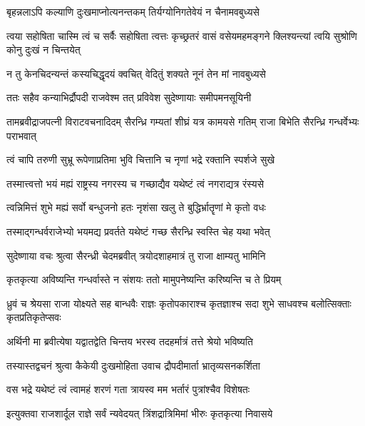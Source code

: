 \twolineshloka
{बृहन्नलाऽपि कल्याणि दुःखमाप्नोत्यनन्तकम्}
{तिर्यग्योनिगतेवेयं न चैनामवबुध्यसे}


\threelineshloka
{त्वया सहोषिता चास्मि त्वं च सर्वैः सहोषिता}
{त्वत्तः कृच्छ्रतरं वासं वसेयमहमङ्गने}
{क्लिश्यन्त्यां त्वयि सुश्रोणि कोनु दुःखं न चिन्तयेत्}


\twolineshloka
{न तु केनचिदन्यन्तं कस्यचिद्धृदयं क्वचित्}
{वेदितुं शक्यते नूनं तेन मां नावबुध्यसे}



\twolineshloka
{ततः सहैव कन्याभिर्द्रौपदी राजवेश्म तत्}
{प्रविवेश सुदेष्णायाः समीपमनसूयिनी}


\threelineshloka
{तामब्रवीद्राजपत्नी विराटवचनादिदम्}
{सैरन्ध्रि गम्यतां शीघ्रं यत्र कामयसे गतिम्}
{राजा बिभेति सैरन्ध्रि गन्धर्वेभ्यः पराभवात्}


\twolineshloka
{त्वं चापि तरुणी सुभ्रू रूपेणाप्रतिमा भुवि}
{चित्तानि च नृणां भद्रे रक्तानि स्पर्शजे सुखे}


\twolineshloka
{तस्मात्त्वत्तो भयं मह्यं राष्ट्रस्य नगरस्य च}
{गच्छाद्यैव यथेष्टं त्वं नगराद्यत्र रंस्यसे}


\twolineshloka
{त्वन्निमित्तं शुभे मह्यं सर्वो बन्धुजनो हतः}
{नृशंसा खलु ते बुद्धिर्भ्रातॄणां मे कृतो वधः}


\twolineshloka
{तस्माद्गन्धर्वराजेभ्यो भयमद्य प्रवर्तते}
{यथेष्टं गच्छ सैरन्ध्रि स्वस्ति चेह यथा भवेत्}



\twolineshloka
{सुदेष्णाया वचः श्रुत्वा सैरन्ध्री चेदमब्रवीत्}
{त्रयोदशाहमात्रं तु राजा क्षाम्यतु भामिनि}


\twolineshloka
{कृतकृत्या अविष्यन्ति गन्धर्वास्ते न संशयः}
{ततो मामुपनेष्यन्ति करिष्यन्ति च ते प्रियम्}


\threelineshloka
{ध्रुवं च श्रेयसा राजा योक्ष्यते सह बान्धवैः}
{राज्ञः कृतोपकाराश्च कृतज्ञाश्च सदा शुभे}
{साधवश्च बलोत्सिक्ताः कृतप्रतिकृतेप्सवः}


\twolineshloka
{अर्थिनी मा ब्रवीत्येषा यद्वातद्वेति चिन्तय}
{भरस्व तदहर्मात्रं तत्ते श्रेयो भविष्यति}



\twolineshloka
{तस्यास्तद्वचनं श्रुत्वा कैकेयी दुःखमोहिता}
{उवाच द्रौपदीमार्ता भ्रातृव्यसनकर्शिता}


\twolineshloka
{वस भद्रे यथेष्टं त्वं त्वामहं शरणं गता}
{त्रायस्व मम भर्तारं पुत्रांश्चैव विशेषतः}


\twolineshloka
{इत्युक्तवा राजशार्दूल राज्ञे सर्वं न्यवेदयत्}
{त्रिंशद्रात्रिमिमां भीरुः कृतकृत्या निवासये}

